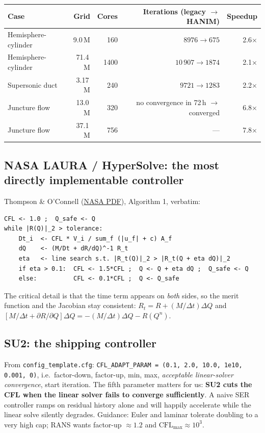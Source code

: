 \documentclass[11pt,a4paper]{article}
\newcommand{\code}[1]{\texttt{\small #1}}
\begin{document}
\begin{center}
\begin{tabular}{@{}lrrrr@{}}
\toprule
Case & Grid & Cores & Iterations (legacy $\to$ HANIM) & Speedup \\
\midrule
Hemisphere-cylinder & 9.0\,M & 160 & $8976 \to 675$ & 2.6$\times$ \\
Hemisphere-cylinder & 71.4\,M & 1400 & $10\,907 \to 1874$ & 2.1$\times$ \\
Supersonic duct & 3.17\,M & 240 & $9721 \to 1283$ & 2.2$\times$ \\
Juncture flow & 13.0\,M & 320 & no convergence in 72\,h $\to$ converged & 6.8$\times$ \\
Juncture flow & 37.1\,M & 756 & --- & 7.8$\times$ \\
\bottomrule
\end{tabular}
\end{center}

\subsection{NASA LAURA / HyperSolve: the most directly implementable controller}
Thompson \& O'Connell
(\href{https://ntrs.nasa.gov/api/citations/20200002615/downloads/20200002615.pdf}{NASA PDF}),
Algorithm 1, verbatim:
\begin{Verbatim}[fontsize=\small,frame=single,framesep=3mm]
CFL <- 1.0 ;  Q_safe <- Q
while |R(Q)|_2 > tolerance:
    Dt_i  <- CFL * V_i / sum_f (|u_f| + c) A_f
    dQ    <- (M/Dt + dR/dQ)^-1 R_t
    eta   <- line search s.t. |R_t(Q)|_2 > |R_t(Q + eta dQ)|_2
    if eta > 0.1:  CFL <- 1.5*CFL ;  Q <- Q + eta dQ ;  Q_safe <- Q
    else:          CFL <- 0.1*CFL ;  Q <- Q_safe
\end{Verbatim}
The critical detail is that the time term appears on \emph{both} sides, so the merit function
and the Jacobian stay consistent:
$R_t = R + (M/\Delta t)\Delta Q$ and
$[M/\Delta t + \partial R/\partial Q]\Delta Q = -(M/\Delta t)\Delta Q - R(Q^n)$.

\subsection{SU2: the shipping controller}
From \code{config\_template.cfg}: \code{CFL\_ADAPT\_PARAM = (0.1, 2.0, 10.0, 1e10, 0.001, 0)},
i.e.\ factor-down, factor-up, min, max, \emph{acceptable linear-solver convergence}, start
iteration. The fifth parameter matters for us: \textbf{SU2 cuts the CFL when the linear solver
fails to converge sufficiently}. A naive SER controller ramps on residual history alone and
will happily accelerate while the linear solve silently degrades. Guidance: Euler and laminar
tolerate doubling to a very high cap; RANS wants factor-up $\approx 1.2$ and
$\mathrm{CFL}_{\max}\approx 10^3$.
\end{document}
